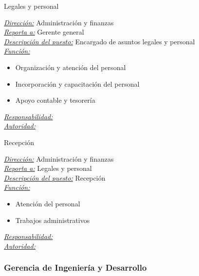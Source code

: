 \documentclass[a4paper,10pt,titlepage]{article}
\begin{document}
     \begin{description}
     \item[Legales y personal] 
     \end{description}
      \underline{\textit{Direcci\'on:}}  Administraci\'on y finanzas \\
      \underline{\textit{Reporta a:}} Gerente general \\
      \underline{\textit{Descripci\'on del puesto:}} Encargado de asuntos legales y personal 
      \bigskip
      \bigskip
      \\
      \underline{\textit{Funci\'on:}} 
        \begin{itemize}
        \item Organizaci\'on y atenci\'on del personal
        \item Incorporaci\'on y capacitaci\'on del personal
        \item Apoyo contable y tesorer\'ia
        \end{itemize}
      \underline{\textit{Responsabilidad:}} \\
      \underline{\textit{Autoridad:}} \\
      \bigskip
      
     \begin{description}
     \item[Recepci\'on] 
     \end{description}
      \underline{\textit{Direcci\'on:}}  Administraci\'on y finanzas \\
      \underline{\textit{Reporta a:}} Legales y personal \\
      \underline{\textit{Descripci\'on del puesto:}} Recepci\'on 
      \bigskip
      \bigskip
      \\
      \underline{\textit{Funci\'on:}}
        \begin{itemize}
        \item Atenci\'on del personal
        \item Trabajos administrativos
        \end{itemize}
      \underline{\textit{Responsabilidad:}} \\
      \underline{\textit{Autoridad:}} \\
      \bigskip


\subsubsection{Gerencia de Ingenier\'ia y Desarrollo}
\end{document}
